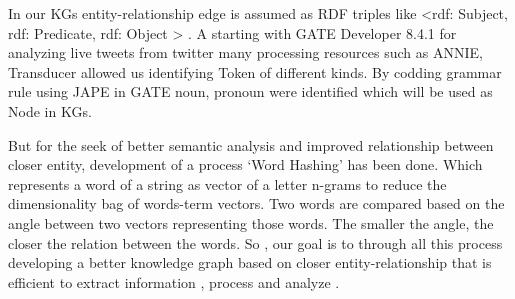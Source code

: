  In our KGs entity-relationship edge is assumed as RDF triples like <rdf: Subject, rdf: Predicate, rdf: Object >  .
A starting with GATE Developer 8.4.1 for analyzing live tweets from twitter many processing resources such as ANNIE, Transducer allowed us identifying Token of different kinds. By codding grammar rule using JAPE in GATE noun, pronoun were identified which will be used as Node in KGs. 


But for the seek of better semantic analysis and improved relationship between closer entity, development of a process ‘Word Hashing’ has been done. Which represents a word of a string as vector of a letter n-grams to reduce the dimensionality bag of words-term vectors. Two words are compared based on the angle between two vectors representing those words. The smaller the angle, the closer the relation between the words. 
So , our goal is to through all this process developing a better knowledge graph based on closer entity-relationship that is efficient to extract information , process and analyze .
\endinput